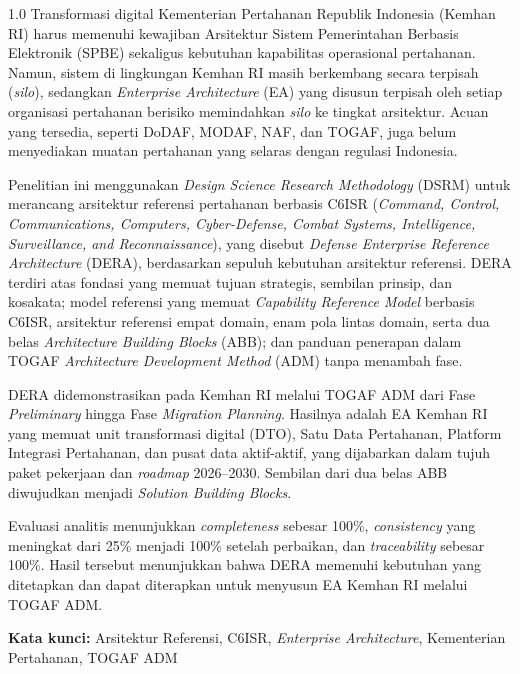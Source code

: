 \begin{spacing}{1.0}
\setlength{\parskip}{6pt} %
Transformasi digital Kementerian Pertahanan Republik Indonesia (Kemhan RI) harus memenuhi kewajiban Arsitektur Sistem Pemerintahan Berbasis Elektronik (SPBE) sekaligus kebutuhan kapabilitas operasional pertahanan. Namun, sistem di lingkungan Kemhan RI masih berkembang secara terpisah (\textit{silo}), sedangkan \textit{Enterprise Architecture} (EA) yang disusun terpisah oleh setiap organisasi pertahanan berisiko memindahkan \textit{silo} ke tingkat arsitektur. Acuan yang tersedia, seperti DoDAF, MODAF, NAF, dan TOGAF, juga belum menyediakan muatan pertahanan yang selaras dengan regulasi Indonesia.

Penelitian ini menggunakan \textit{Design Science Research Methodology} (DSRM) untuk merancang arsitektur referensi pertahanan berbasis C6ISR (\textit{Command, Control, Communications, Computers, Cyber-Defense, Combat Systems, Intelligence, Surveillance, and Reconnaissance}), yang disebut \textit{Defense Enterprise Reference Architecture} (DERA), berdasarkan sepuluh kebutuhan arsitektur referensi. DERA terdiri atas fondasi yang memuat tujuan strategis, sembilan prinsip, dan kosakata; model referensi yang memuat \textit{Capability Reference Model} berbasis C6ISR, arsitektur referensi empat domain, enam pola lintas domain, serta dua belas \textit{Architecture Building Blocks} (ABB); dan panduan penerapan dalam TOGAF \textit{Architecture Development Method} (ADM) tanpa menambah fase.

DERA didemonstrasikan pada Kemhan RI melalui TOGAF ADM dari Fase \textit{Preliminary} hingga Fase \textit{Migration Planning}. Hasilnya adalah EA Kemhan RI yang memuat unit transformasi digital (DTO), Satu Data Pertahanan, Platform Integrasi Pertahanan, dan pusat data aktif-aktif, yang dijabarkan dalam tujuh paket pekerjaan dan \textit{roadmap} 2026–2030. Sembilan dari dua belas ABB diwujudkan menjadi \textit{Solution Building Blocks}.

Evaluasi analitis menunjukkan \textit{completeness} sebesar 100\%, \textit{consistency} yang meningkat dari 25\% menjadi 100\% setelah perbaikan, dan \textit{traceability} sebesar 100\%. Hasil tersebut menunjukkan bahwa DERA memenuhi kebutuhan yang ditetapkan dan dapat diterapkan untuk menyusun EA Kemhan RI melalui TOGAF ADM.

\noindent\textbf{Kata kunci:} Arsitektur Referensi, C6ISR, \textit{Enterprise Architecture}, Kementerian Pertahanan, TOGAF ADM
\end{spacing}
